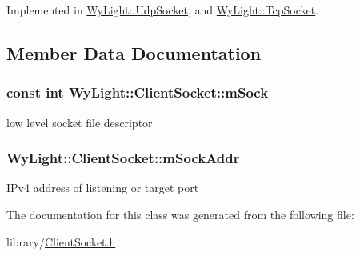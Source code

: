 Implemented in \hyperlink{class_wy_light_1_1_udp_socket_aaba73a044c8aed0ef0c1e44ce46d88ca}{Wy\-Light\-::\-Udp\-Socket}, and \hyperlink{class_wy_light_1_1_tcp_socket_acd2ed7e05e7a8efc55b01e422d957857}{Wy\-Light\-::\-Tcp\-Socket}.



\subsection{Member Data Documentation}
\hypertarget{class_wy_light_1_1_client_socket_a339a7d8dd046156f3d7c148181ac0673}{
\subsubsection[{m\-Sock}]{\setlength{\rightskip}{0pt plus 5cm}const int Wy\-Light\-::\-Client\-Socket\-::m\-Sock\hspace{0.3cm}{\ttfamily [protected]}}}\label{class_wy_light_1_1_client_socket_a339a7d8dd046156f3d7c148181ac0673}
low level socket file descriptor \hypertarget{class_wy_light_1_1_client_socket_a3849426773c4b3e300edc8cd3b37b16a}{
\subsubsection[{m\-Sock\-Addr}]{ Wy\-Light\-::\-Client\-Socket\-::m\-Sock\-Addr\hspace{0.3cm}{\ttfamily [protected]}}}\label{class_wy_light_1_1_client_socket_a3849426773c4b3e300edc8cd3b37b16a}
I\-Pv4 address of listening or target port 

The documentation for this class was generated from the following file\-:\begin{DoxyCompactItemize}
\item 
library/\hyperlink{_client_socket_8h}{Client\-Socket.\-h}\end{DoxyCompactItemize}
